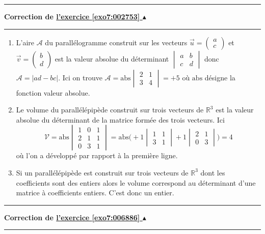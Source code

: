 \documentclass[11pt,a4paper]{article}
\newcommand{\Rr}{\mathbb{R}} \newcommand{\R}{\mathbb{R}}
\newcounter{exo}
\newcommand{\correction}[1]{\hypertarget{cor7:#1}{}\label{cor7:#1}{\bf Correction de \hyperlink{exo7:#1}{l'exercice \ref{exo7:#1} $\blacktriangle$}}\vspace{1mm}\hrule\vspace{1mm}}
\newcommand{\fincorrection}{\vspace{1mm}\hrule\vspace*{7mm}}
\begin{document}
\fincorrection
\correction{002753}
\begin{enumerate}
  \item L'aire $\mathcal{A}$ du parallélogramme construit sur les vecteurs $\vec{u} = \left(\begin{array}{c}a\\c\end{array}\right)$ et 
$\vec{v} = \left(\begin{array}{c}b\\d\end{array}\right)$ est la valeur absolue du déterminant $\begin{vmatrix} a & b \\ c & d \end{vmatrix}$
donc $\mathcal{A} =  |ad-bc|$.
Ici on trouve 
$\mathcal{A} = \text{abs} \begin{vmatrix} 2 & 1 \\ 3 & 4 \end{vmatrix} = + 5 $
où $\text{abs}$ désigne la fonction valeur absolue.

  \item Le volume  du  parall\'el\'epip\`ede construit sur trois vecteurs de $\Rr^3$ est la valeur absolue du déterminant
de la matrice formée des trois vecteurs.
Ici $$\mathcal{V} = \text{abs} \begin{vmatrix} 1 & 0 & 1 \\ 2 & 1 & 1 \\ 0 & 3 & 1\end{vmatrix} 
= \text{abs} \Big(+1 \begin{vmatrix} 1 & 1 \\ 3 & 1\end{vmatrix}  + 1  \begin{vmatrix} 2 & 1 \\ 0 & 3 \end{vmatrix}
\Big)= 4$$
où l'on a développé par rapport à la première ligne.

  \item Si un parall\'el\'epip\`ede est construit sur trois vecteurs de $\Rr^3$
dont les coefficients sont des entiers alors le volume correspond au déterminant d'une matrice à coefficients
entiers. C'est donc un entier.

\end{enumerate}
\fincorrection
\correction{006886}
\end{document}
